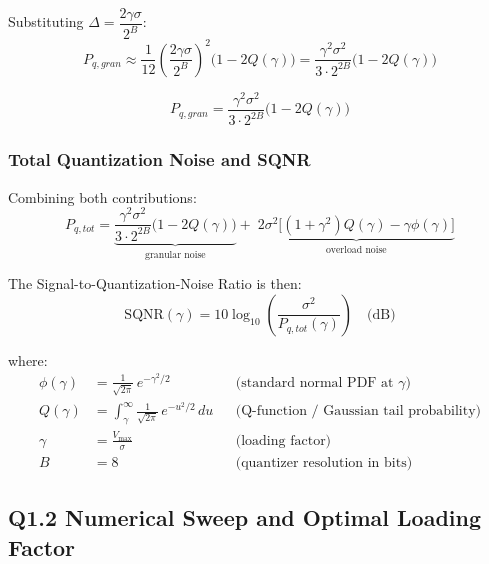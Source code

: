 \documentclass{article}
\begin{document}
Substituting $\Delta = \dfrac{2\gamma\sigma}{2^B}$:
\begin{equation}
    P_{q,gran} \approx \frac{1}{12}\left(\frac{2\gamma\sigma}{2^B}
                \right)^2 \bigl(1 - 2Q(\gamma)\bigr)
                = \frac{\gamma^2\sigma^2}{3 \cdot 2^{2B}}
                \bigl(1 - 2Q(\gamma)\bigr)
\end{equation}

\begin{equation}
\boxed{
    P_{q,gran} = \frac{\gamma^2\sigma^2}{3 \cdot 2^{2B}}
                 \bigl(1 - 2Q(\gamma)\bigr)
}
\end{equation}
\subsubsection*{Total Quantization Noise and SQNR}

Combining both contributions:
\begin{equation}
\boxed{
    P_{q,tot} = \underbrace{\frac{\gamma^2\sigma^2}{3 \cdot 2^{2B}}
                \bigl(1-2Q(\gamma)\bigr)}_{\text{granular noise}}
                +\;
                \underbrace{2\sigma^2\bigl[(1+\gamma^2)Q(\gamma) 
                - \gamma\phi(\gamma)\bigr]}_{\text{overload noise}}
}
\end{equation}

The Signal-to-Quantization-Noise Ratio is then:
\begin{equation}
    \text{SQNR}(\gamma) = 10\log_{10}\!\left(
        \frac{\sigma^2}{P_{q,tot}(\gamma)}
    \right) \quad \text{(dB)}
\end{equation}

where:
\begin{align*}
    \phi(\gamma) &= \frac{1}{\sqrt{2\pi}}\,e^{-\gamma^2/2} 
                 &&\text{(standard normal PDF at } \gamma\text{)}\\
    Q(\gamma)    &= \int_{\gamma}^{\infty} \frac{1}{\sqrt{2\pi}}\,
                    e^{-u^2/2}\,du 
                 &&\text{(Q-function / Gaussian tail probability)}\\
    \gamma       &= \frac{V_{\max}}{\sigma} 
                 &&\text{(loading factor)}\\
    B            &= 8 
                 &&\text{(quantizer resolution in bits)}
\end{align*}

\subsection*{Q1.2 Numerical Sweep and Optimal Loading Factor}
\end{document}
